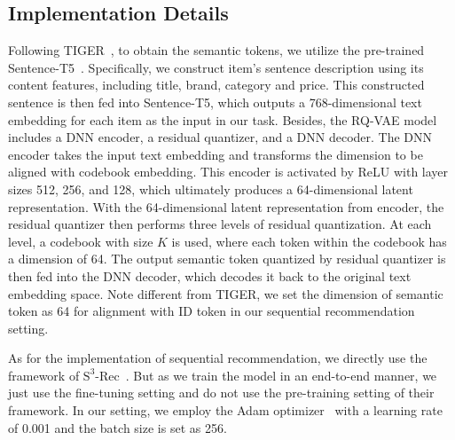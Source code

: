 \subsection{Implementation Details}\label{appendix:implementation}
Following TIGER~\citep{rajput2024recommender}, to obtain the semantic tokens, we utilize the pre-trained Sentence-T5~\citep{ni2021sentence}. Specifically, we construct item's sentence description using its content features, including title, brand, category and price. This constructed sentence is then fed into Sentence-T5, which outputs a 768-dimensional text embedding for each item as the input in our task. Besides, the RQ-VAE model includes a DNN encoder, a residual quantizer, and a DNN decoder. The DNN encoder takes the input text embedding and transforms the dimension to be aligned with codebook embedding. This encoder is activated by ReLU with layer sizes 512, 256, and 128, which ultimately produces a 64-dimensional latent representation. With the 64-dimensional latent representation from encoder, the residual quantizer then performs three levels of residual quantization. At each level, a codebook with size $K$ is used, where each token within the codebook has a dimension of 64. The output semantic token quantized by residual quantizer is then fed into the DNN decoder, which decodes it back to the original text embedding space. Note different from TIGER, we set the dimension of semantic token as 64 for alignment with ID token in our sequential recommendation setting. 

As for the implementation of sequential recommendation, we directly use the framework of $\text{S}^3\text{-Rec}$~\citep{zhou2020s3}. But as we train the model in an end-to-end manner, we just use the fine-tuning setting and do not use the pre-training setting of their framework. In our setting, we employ the Adam optimizer~\citep{kingma2014adam} with a learning rate of 0.001 and the batch size is set as 256.

